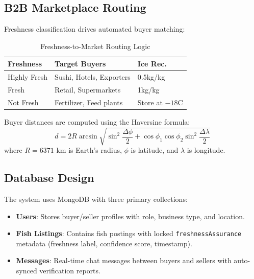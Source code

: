 \documentclass[conference]{IEEEtran}
\begin{document}
\subsection{B2B Marketplace Routing}

Freshness classification drives automated buyer matching:

\begin{table}[h]
\centering
\caption{Freshness-to-Market Routing Logic}
\label{tab:routing}
\begin{tabular}{lll}
\toprule
\textbf{Freshness} & \textbf{Target Buyers} & \textbf{Ice Rec.} \\
\midrule
Highly Fresh & Sushi, Hotels, Exporters & 0.5kg/kg \\
Fresh & Retail, Supermarkets & 1kg/kg \\
Not Fresh & Fertilizer, Feed plants & Store at $-18$\textdegree{}C \\
\bottomrule
\end{tabular}
\end{table}

Buyer distances are computed using the Haversine formula:
\begin{equation}
d = 2R \arcsin\sqrt{\sin^2\frac{\Delta\phi}{2} + \cos\phi_1 \cos\phi_2 \sin^2\frac{\Delta\lambda}{2}}
\end{equation}
where $R = 6371$ km is Earth's radius, $\phi$ is latitude, and $\lambda$ is longitude.

\subsection{Database Design}

The system uses MongoDB with three primary collections:
\begin{itemize}[leftmargin=*]
    \item \textbf{Users}: Stores buyer/seller profiles with role, business type, and location.
    \item \textbf{Fish Listings}: Contains fish postings with locked \texttt{freshnessAssurance} metadata (freshness label, confidence score, timestamp).
    \item \textbf{Messages}: Real-time chat messages between buyers and sellers with auto-synced verification reports.
\end{itemize}

\end{document}
